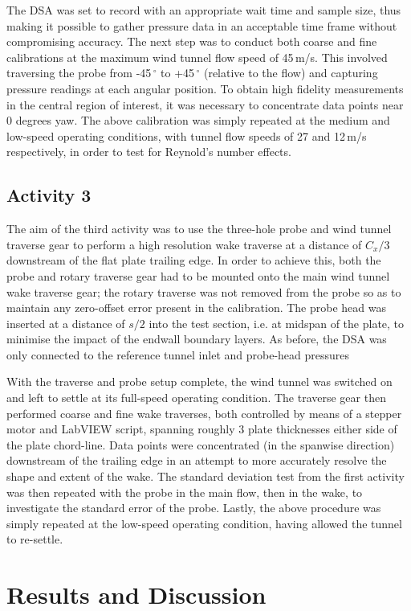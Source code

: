 \documentclass[11pt,a4paper,twocolumn]{article}
\begin{document}
The DSA was set to record with an appropriate wait time and sample size, thus making it possible to gather pressure data in an acceptable time frame without compromising accuracy. The next step was to conduct both coarse and fine calibrations at the maximum wind tunnel flow speed of 45\,m/s. This involved traversing the probe from -45\,$^\circ$ to +45\,$^\circ$ (relative to the flow) and capturing pressure readings at each angular position. To obtain high fidelity measurements in the central region of interest, it was necessary to concentrate data points near 0 degrees yaw. The above calibration was simply repeated at the medium and low-speed operating conditions, with tunnel flow speeds of 27 and 12\,m/s respectively, in order to test for Reynold’s number effects. 

\subsection{Activity 3}
The aim of the third activity was to use the three-hole probe and wind tunnel traverse gear to perform a high resolution wake traverse at a distance of $C_x /3$ downstream of the flat plate trailing edge. In order to achieve this, both the probe and rotary traverse gear had to be mounted onto the main wind tunnel wake traverse gear; the rotary traverse was not removed from the probe so as to maintain any zero-offset error present in the calibration. The probe head was inserted at a distance of $s/2$ into the test section, i.e. at midspan of the plate, to minimise the impact of the endwall boundary layers. As before, the DSA was only connected to the reference tunnel inlet and probe-head pressures

With the traverse and probe setup complete, the wind tunnel was switched on and left to settle at its full-speed operating condition. The traverse gear then performed coarse and fine wake traverses, both controlled by means of a stepper motor and LabVIEW script, spanning roughly 3 plate thicknesses either side of the plate chord-line. Data points were concentrated (in the spanwise direction) downstream of the trailing edge in an attempt to more accurately resolve the shape and extent of the wake. The standard deviation test from the first activity was then repeated with the probe in the main flow, then in the wake,  to investigate the standard error of the probe. Lastly, the above procedure was simply  repeated at the low-speed operating condition, having allowed the tunnel to re-settle. 

\section{Results and Discussion}
\end{document}
